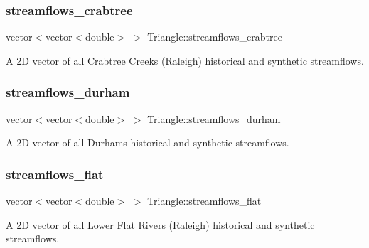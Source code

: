 \subsubsection{\texorpdfstring{streamflows\+\_\+crabtree}{streamflows\_crabtree}}
{\footnotesize\ttfamily vector$<$vector$<$double$>$ $>$ Triangle\+::streamflows\+\_\+crabtree\hspace{0.3cm}{\ttfamily [private]}}



A 2D vector of all Crabtree Creek\textquotesingle{}s (Raleigh) historical and synthetic streamflows. 

\mbox{\label{classTriangle_a20fe79b08b5b0db16b3154d4d9a9b5eb}} 
\subsubsection{\texorpdfstring{streamflows\+\_\+durham}{streamflows\_durham}}
{\footnotesize\ttfamily vector$<$vector$<$double$>$ $>$ Triangle\+::streamflows\+\_\+durham\hspace{0.3cm}{\ttfamily [private]}}



A 2D vector of all Durham\textquotesingle{}s historical and synthetic streamflows. 

\mbox{\label{classTriangle_a1d93dad189b3fb422f5404f75a08b6f7}} 
\subsubsection{\texorpdfstring{streamflows\+\_\+flat}{streamflows\_flat}}
{\footnotesize\ttfamily vector$<$vector$<$double$>$ $>$ Triangle\+::streamflows\+\_\+flat\hspace{0.3cm}{\ttfamily [private]}}



A 2D vector of all Lower Flat River\textquotesingle{}s (Raleigh) historical and synthetic streamflows. 

\mbox{\label{classTriangle_a2303d7ba019fa2c88ad9bcf4968b9522}} 
